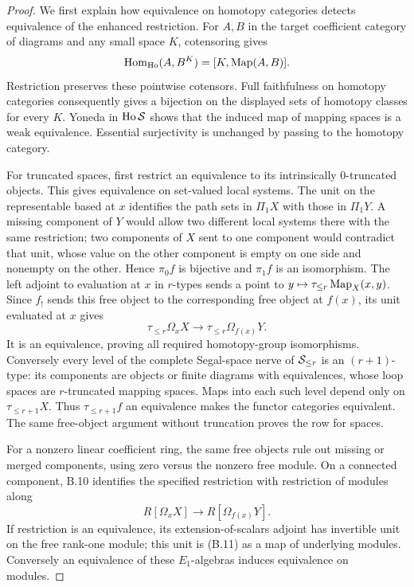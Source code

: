 \begin{proof}
We first explain how equivalence on homotopy categories detects
equivalence of the enhanced restriction. For $A,B$ in the target
coefficient category of diagrams and any small space $K$, cotensoring
gives
\[
 \operatorname{Hom}_{\operatorname{Ho}}(A,B^K)=
 [K,\operatorname{Map}(A,B)].
\]
Restriction preserves these pointwise cotensors. Full faithfulness on
homotopy categories consequently gives a bijection on the displayed
sets of homotopy classes for every $K$. Yoneda in $\operatorname{Ho}\mathcal S$ shows
that the induced map of mapping spaces is a weak equivalence.
Essential surjectivity is unchanged by passing to the homotopy category.

For truncated spaces, first restrict an equivalence to its intrinsically
0-truncated objects. This gives equivalence on set-valued local systems.
The unit on the representable based at $x$ identifies the path sets in
$\Pi_1X$ with those in $\Pi_1Y$. A missing component of $Y$ would allow
two different local systems there with the same restriction; two
components of $X$ sent to one component would contradict that unit,
whose value on the other component is empty on one side and nonempty
on the other. Hence $\pi_0f$ is bijective and $\pi_1f$ is an isomorphism.
The left adjoint to evaluation at $x$ in $r$-types sends a point to
$y\mapsto\tau_{\leq r}\operatorname{Map}_X(x,y)$. Since $f_!$ sends this free object
to the corresponding free object at $f(x)$, its unit evaluated at $x$
gives
\[
 \tau_{\leq r}\Omega_xX\longrightarrow
 \tau_{\leq r}\Omega_{f(x)}Y.
\]
It is an equivalence, proving all required homotopy-group isomorphisms.
Conversely every level of the complete Segal-space nerve of
$\mathcal S_{\leq r}$ is an $(r+1)$-type: its components are objects or
finite diagrams with equivalences, whose loop spaces are $r$-truncated
mapping spaces. Maps into each such level depend only on
$\tau_{\leq r+1}X$. Thus $\tau_{\leq r+1}f$ an equivalence makes the
functor categories equivalent. The same free-object argument without
truncation proves the row for spaces.

For a nonzero linear coefficient ring, the same free objects rule out
missing or merged components, using zero versus the nonzero free
module. On a connected component, B.10 identifies the specified
restriction with restriction of modules along
\[
 R[\Omega_xX]\longrightarrow R[\Omega_{f(x)}Y].
\tag{B.11}
\]
If restriction is an equivalence, its extension-of-scalars adjoint has
invertible unit on the free rank-one module; this unit is (B.11) as a
map of underlying modules. Conversely an equivalence of these
$E_1$-algebras induces equivalence on modules.


\end{proof}
